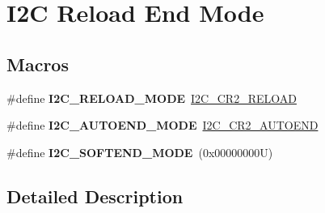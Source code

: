 \hypertarget{group___i2_c___r_e_l_o_a_d___e_n_d___m_o_d_e}{}\section{I2C Reload End Mode}
\label{group___i2_c___r_e_l_o_a_d___e_n_d___m_o_d_e}
\subsection*{Macros}
\begin{DoxyCompactItemize}
\item 
\mbox{\label{group___i2_c___r_e_l_o_a_d___e_n_d___m_o_d_e_ga3d83e7d82dfb916acd8773dd455db4ed}} 
\#define {\bfseries I2\+C\+\_\+\+R\+E\+L\+O\+A\+D\+\_\+\+M\+O\+DE}~\hyperlink{group___peripheral___registers___bits___definition_ga21a796045451013c964ef8b12ca6c9bb}{I2\+C\+\_\+\+C\+R2\+\_\+\+R\+E\+L\+O\+AD}
\item 
\mbox{\label{group___i2_c___r_e_l_o_a_d___e_n_d___m_o_d_e_ga7608350f015782c2066afc98e8e00dc3}} 
\#define {\bfseries I2\+C\+\_\+\+A\+U\+T\+O\+E\+N\+D\+\_\+\+M\+O\+DE}~\hyperlink{group___peripheral___registers___bits___definition_gabcf789c74e217ec8967bcabc156a6c54}{I2\+C\+\_\+\+C\+R2\+\_\+\+A\+U\+T\+O\+E\+ND}
\item 
\mbox{\label{group___i2_c___r_e_l_o_a_d___e_n_d___m_o_d_e_ga2af308b39681e4170d02acefcd69d3cf}} 
\#define {\bfseries I2\+C\+\_\+\+S\+O\+F\+T\+E\+N\+D\+\_\+\+M\+O\+DE}~(0x00000000\+U)
\end{DoxyCompactItemize}


\subsection{Detailed Description}
